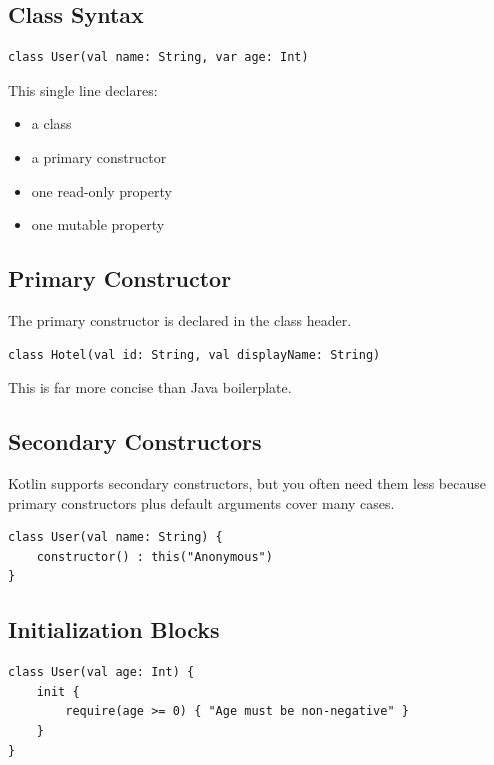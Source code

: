 \documentclass[11pt,a4paper]{article}
\begin{document}
\subsection{Class Syntax}

\begin{lstlisting}[style=kazekotlin]
class User(val name: String, var age: Int)
\end{lstlisting}

This single line declares:
\begin{itemize}
    \item a class
    \item a primary constructor
    \item one read-only property
    \item one mutable property
\end{itemize}

\subsection{Primary Constructor}

The primary constructor is declared in the class header.

\begin{lstlisting}[style=kazekotlin]
class Hotel(val id: String, val displayName: String)
\end{lstlisting}

This is far more concise than Java boilerplate.

\subsection{Secondary Constructors}

Kotlin supports secondary constructors, but you often need them less because primary constructors plus default arguments cover many cases.

\begin{lstlisting}[style=kazekotlin]
class User(val name: String) {
    constructor() : this("Anonymous")
}
\end{lstlisting}

\subsection{Initialization Blocks}

\begin{lstlisting}[style=kazekotlin]
class User(val age: Int) {
    init {
        require(age >= 0) { "Age must be non-negative" }
    }
}
\end{lstlisting}
\end{document}
